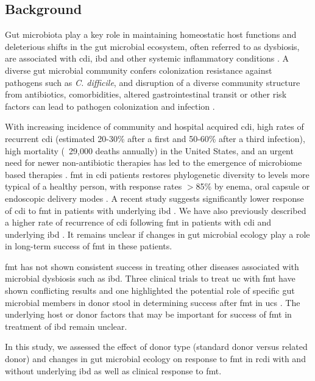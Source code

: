 \subsection{Background}

Gut microbiota play a key role in maintaining homeostatic host functions and deleterious shifts in the gut microbial ecosystem, often referred to as dysbiosis, are associated with \gls{cdi}, \gls{ibd} and other systemic inflammatory conditions \cite{RN1477}. A diverse gut microbial community confers colonization resistance against pathogens such as \textit{C. difficile}, and disruption of a diverse community structure from antibiotics, comorbidities, altered gastrointestinal transit or other risk factors can lead to pathogen colonization and infection \cite{RN1480}.

With increasing incidence of community and hospital acquired \gls{cdi}, high rates of recurrent \gls{cdi} (estimated 20-30\% after a first and 50-60\% after a third infection), high mortality (~29,000 deaths annually) in the United States, and an urgent need for newer non-antibiotic therapies has led to the emergence of microbiome based therapies \cite{RN1478}. \Gls{fmt} in \gls{cdi} patients restores phylogenetic diversity to levels more typical of a healthy person, with response rates $>$85\% by enema, oral capsule or endoscopic delivery modes \cite{RN1484, RN1479, RN1481}. A recent study suggests significantly lower response of \gls{cdi} to \gls{fmt} in patients with underlying \gls{ibd} \cite{RN1497}. We have also previously described a higher rate of recurrence of \gls{cdi} following \gls{fmt} in patients with \gls{cdi} and underlying \gls{ibd} \cite{RN1498}. It remains unclear if changes in gut microbial ecology play a role in long-term success of \gls{fmt} in these patients.

\Gls{fmt} has not shown consistent success in treating other diseases associated with microbial dysbiosis such as \gls{ibd}. Three clinical trials to treat \gls{uc} with \gls{fmt} have shown conflicting results and one highlighted the potential role of specific gut microbial members in donor stool in determining success after \gls{fmt} in \glspl{uc} \cite{RN3982, RN1019, RN1483}.  The underlying host or donor factors that may be important for success of \gls{fmt} in treatment of \gls{ibd} remain unclear.

In this study, we assessed the effect of donor type (standard donor versus related donor) and changes in gut microbial ecology on response to \gls{fmt} in \gls{rcdi} with and without underlying \gls{ibd} as well as clinical response to \gls{fmt}. 

